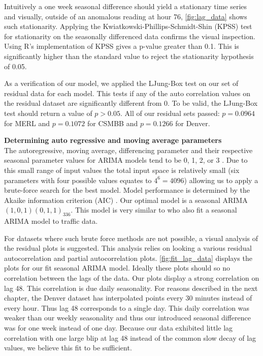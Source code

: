 Intuitively a one week seasonal difference should yield a stationary time series and visually, outside of an anomalous reading at hour 76, \ref{fig:lag_data} shows such stationarity.  Applying the Kwiatkowski-Phillips-Schmidt-Shin (KPSS) \cite{Kwiatkowski1992} test for stationarity on the seasonally differenced data confirms the visual inspection.  Using R's implementation of KPSS gives a p-value greater than 0.1.  This is significantly higher than the standard value to reject the stationarity hypothesis of 0.05.  

As a verification of our model, we applied the LJung-Box test \cite{Ljung1978} on our set of residual data for each model.  This tests if any of the auto correlation values on the residual dataset are significantly different from 0.  To be valid, the LJung-Box test should return a value of $p > 0.05$.  All of our residual sets passed: $p = 0.0964$ for MERL and $p = 0.1072$ for CSMBB and $p = 0.1266$ for Denver.   

\bigskip
\noindent \textbf{Determining auto regressive and moving average parameters} \\
The autoregressive, moving average, differencing parameter and their respective seasonal parameter values for ARIMA models tend to be 0, 1, 2, or 3 \cite{Box2008}.  Due to this small range of input values the total input space is relatively small (six parameters with four possible values equates to $4^6 = 4096$) allowing us to apply a brute-force search for the best model.  Model performance is determined by the Akaike information criterion (AIC) \cite{Akaike1974}.  Our optimal model is a seasonal ARIMA $(1,0,1)(0,1,1)_{336}$.  This model is very similar to \cite{Williams2003} who also fit a seasonal ARIMA model to traffic data.

For datasets where such brute force methods are not possible, a visual analysis of the residual plots is suggested.  This analysis relies on looking a various residual autocorrelation and partial autocorrelation plots.  \ref{fig:fit_lag_data} displays the plots for our fit seasonal ARIMA model.  Ideally these plots should so no correlation between the lags of the data.  Our plots display a strong correlation on lag 48.  This correlation is due daily seasonality.  For reasons described in the next chapter, the Denver dataset has interpolated points every 30 minutes instead of every hour.  Thus lag 48 corresponds to a single day.  This daily correlation was weaker than our weekly seasonality and thus our introduced seasonal difference was for one week instead of one day.  Because our data exhibited little lag correlation with one large blip at lag 48 instead of the common slow decay of lag values, we believe this fit to be sufficient.  

